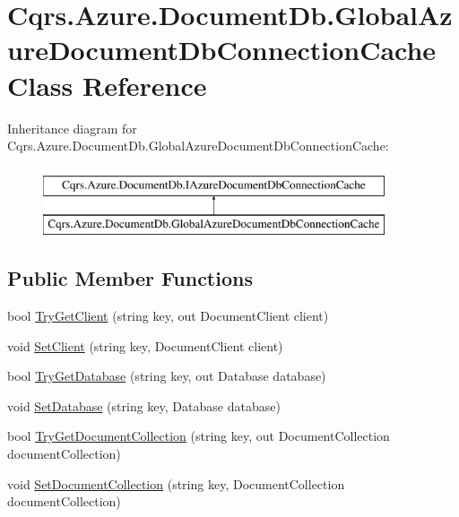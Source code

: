 \hypertarget{classCqrs_1_1Azure_1_1DocumentDb_1_1GlobalAzureDocumentDbConnectionCache}{}\section{Cqrs.\+Azure.\+Document\+Db.\+Global\+Azure\+Document\+Db\+Connection\+Cache Class Reference}
\label{classCqrs_1_1Azure_1_1DocumentDb_1_1GlobalAzureDocumentDbConnectionCache}
Inheritance diagram for Cqrs.\+Azure.\+Document\+Db.\+Global\+Azure\+Document\+Db\+Connection\+Cache\+:\begin{figure}[H]
\begin{center}
\leavevmode
\includegraphics[height=2.000000cm]{classCqrs_1_1Azure_1_1DocumentDb_1_1GlobalAzureDocumentDbConnectionCache}
\end{center}
\end{figure}
\subsection*{Public Member Functions}
\begin{DoxyCompactItemize}
\item 
bool \hyperlink{classCqrs_1_1Azure_1_1DocumentDb_1_1GlobalAzureDocumentDbConnectionCache_a5b91ecf67ee594a0a6a4d3193f381c6e_a5b91ecf67ee594a0a6a4d3193f381c6e}{Try\+Get\+Client} (string key, out Document\+Client client)
\item 
void \hyperlink{classCqrs_1_1Azure_1_1DocumentDb_1_1GlobalAzureDocumentDbConnectionCache_a4fbca6dadf7b2d1ffa753d755982820b_a4fbca6dadf7b2d1ffa753d755982820b}{Set\+Client} (string key, Document\+Client client)
\item 
bool \hyperlink{classCqrs_1_1Azure_1_1DocumentDb_1_1GlobalAzureDocumentDbConnectionCache_afa1518eacc7e71308bfe3ef27631da45_afa1518eacc7e71308bfe3ef27631da45}{Try\+Get\+Database} (string key, out Database database)
\item 
void \hyperlink{classCqrs_1_1Azure_1_1DocumentDb_1_1GlobalAzureDocumentDbConnectionCache_a1684f60eabfa556929fc264e0192906b_a1684f60eabfa556929fc264e0192906b}{Set\+Database} (string key, Database database)
\item 
bool \hyperlink{classCqrs_1_1Azure_1_1DocumentDb_1_1GlobalAzureDocumentDbConnectionCache_a9b178e41d62c9ebcfd8936418d5de009_a9b178e41d62c9ebcfd8936418d5de009}{Try\+Get\+Document\+Collection} (string key, out Document\+Collection document\+Collection)
\item 
void \hyperlink{classCqrs_1_1Azure_1_1DocumentDb_1_1GlobalAzureDocumentDbConnectionCache_a19c4bcbf0149036557fb8a3a3b687c79_a19c4bcbf0149036557fb8a3a3b687c79}{Set\+Document\+Collection} (string key, Document\+Collection document\+Collection)
\end{DoxyCompactItemize}
